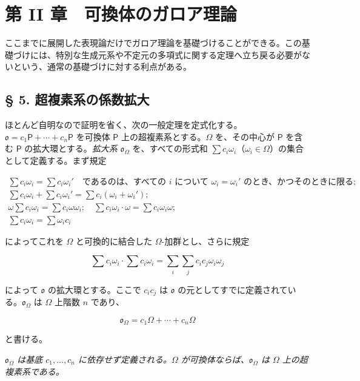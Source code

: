 \section*{第 II 章　可換体のガロア理論}\label{kapitel-ii.-galoissche-theorie-kommutativer-koerper}

ここまでに展開した表現論だけでガロア理論を基礎づけることができる。この基礎づけには、特別な生成元系や不定元の多項式に関する定理へ立ち戻る必要がないという、通常の基礎づけに対する利点がある。

\subsection*{§ 5. 超複素系の係数拡大}\label{koeffizientenerweiterung-hyperkomplexer-systeme}

ほとんど自明なので証明を省く、次の一般定理を定式化する。$\mathfrak{o}=c_1\mathsf P+\cdots+c_n\mathsf P$ を可換体 $\mathsf P$ 上の超複素系とする。$\Omega$ を、その中心が $\mathsf P$ を含む $\mathsf P$ の拡大環とする。\emph{拡大系} $\mathfrak{o}_{\Omega}$ を、すべての形式和 $\sum c_i\omega_i$（$\omega_i\in\Omega$）の集合として定義する。まず規定

\[
\begin{array}{l}
\sum c_i\omega_i=\sum c_i\omega_i' \quad\text{であるのは、すべての $i$ について $\omega_i=\omega_i'$ のとき、かつそのときに限る};\\
\sum c_i\omega_i+\sum c_i\omega_i'=\sum c_i(\omega_i+\omega_i');\\
\omega\sum c_i\omega_i=\sum c_i\omega\omega_i;\quad
\sum c_i\omega_i\cdot\omega=\sum c_i\omega_i\omega;\\
\sum c_i\omega_i=\sum \omega_i c_i
\end{array}
\]

によってこれを $\Omega$ と可換的に結合した $\Omega$-加群とし、さらに規定

\[
\sum c_i\omega_i\cdot \sum c_i\omega_i
=\sum_i\sum_j c_ic_j\omega_i\omega_j
\]

によって $\mathfrak{o}$ の拡大環とする。ここで $c_ic_j$ は $\mathfrak{o}$ の元としてすでに定義されている。$\mathfrak{o}_{\Omega}$ は $\Omega$ 上階数 $n$ であり、

\[
\mathfrak{o}_{\Omega}=c_1\Omega+\cdots+c_n\Omega
\]

と書ける。

\emph{$\mathfrak{o}_{\Omega}$ は基底 $c_1,\ldots,c_n$ に依存せず定義される。$\Omega$ が可換体ならば、$\mathfrak{o}_{\Omega}$ は $\Omega$ 上の超複素系である。}

